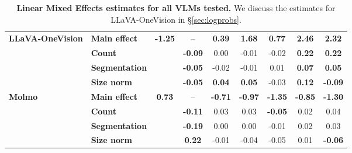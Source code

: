 \begin{table*}[t]
\begin{tabular}{ll|c|c|ccccc}
\multirow{4}{*}{\textbf{LLaVA-OneVision}}
    & \textbf{Main effect} & \multirow{4}{*}{\textbf{-1.25}} & -- & \textbf{0.39} & \textbf{1.68} & \textbf{0.77} & \textbf{2.46} & \textbf{2.32} \\
    & \textbf{Count}        && \textbf{-0.09} & 0.00 & -0.01 & -0.02 & \textbf{0.22} & \textbf{0.22} \\
    & \textbf{Segmentation} && \textbf{-0.05} & -0.02 & -0.01 & 0.01 & \textbf{0.07} & \textbf{0.05} \\
    & \textbf{Size norm}    && \textbf{-0.05} & \textbf{0.04} & \textbf{0.05} & -0.03 & \textbf{0.12} & \textbf{-0.09} \\
    \midrule

\multirow{4}{*}{\textbf{Molmo}}
    & \textbf{Main effect} & \multirow{4}{*}{\textbf{0.73}} & -- & \textbf{-0.71} & \textbf{-0.97} & \textbf{-1.35} & \textbf{-0.85} & \textbf{-1.30} \\
    & \textbf{Count}        && \textbf{-0.11} & 0.03 & 0.03 & \textbf{-0.05} & 0.02 & 0.04 \\
    & \textbf{Segmentation} && \textbf{-0.19} & 0.00 & 0.00 & -0.01 & 0.02 & 0.03 \\
    & \textbf{Size norm}    && \textbf{0.22} & -0.01 & -0.04 & -0.05 & 0.01 & \textbf{-0.06} \\
    \bottomrule

\end{tabular}
\caption{\textbf{Linear Mixed Effects estimates for all VLMs tested.} We discuss the estimates for LLaVA-OneVision in \S\ref{sec:logprobs}.}
\label{tab:exp1_lmms_extra}
\end{table*}

